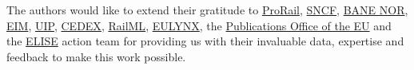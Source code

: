 The authors would like to extend their gratitude to 
\href{https://www.prorail.nl/}{ProRail}, 
\href{https://www.sncf.com/en}{SNCF},
\href{https://www.banenor.no/}{BANE NOR},
\href{https://eimrail.org/}{EIM},
\href{https://uiprail.org/}{UIP}, 
\href{http://www.cedex.es/CEDEX/lang_castellano/}{CEDEX},
\href{https://www.railml.org/en/}{RailML},
\href{https://www.eulynx.eu/}{EULYNX},
the \href{https://op.europa.eu/en/home}{Publications Office of the EU} 
and the \href{https://ec.europa.eu/isa2/actions/improving-cross-border-exchange-location-information\_en}{ELISE} action team 
for providing us with their invaluable data, expertise and feedback to make this work possible.